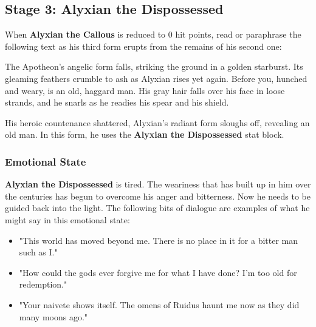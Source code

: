 \documentclass[10pt,a4,twoside,twocolumn,openany,nodeprecatedcode]{dndbook}
\begin{document}
\subsection{Stage 3: Alyxian the Dispossessed}
When \textbf{Alyxian the Callous} is reduced to 0 hit points, read or paraphrase the following text as his third form erupts from the remains of his second one:
\begin{DndReadAloud}{}
The Apotheon's angelic form falls, striking the ground in a golden starburst. Its gleaming feathers crumble to ash as Alyxian rises yet again. Before you, hunched and weary, is an old, haggard man. His gray hair falls over his face in loose strands, and he snarls as he readies his spear and his shield.
\end{DndReadAloud}

His heroic countenance shattered, Alyxian's radiant form sloughs off, revealing an old man. In this form, he uses the \textbf{Alyxian the Dispossessed} stat block.
\subsubsection{Emotional State}
\textbf{Alyxian the Dispossessed} is tired. The weariness that has built up in him over the centuries has begun to overcome his anger and bitterness. Now he needs to be guided back into the light.
The following bits of dialogue are examples of what he might say in this emotional state:
\begin{itemize}

\item "This world has moved beyond me. There is no place in it for a bitter man such as I."
\item "How could the gods ever forgive me for what I have done? I'm too old for redemption."
\item "Your naivete shows itself. The omens of Ruidus haunt me now as they did many moons ago."
\end{itemize}
\end{document}
